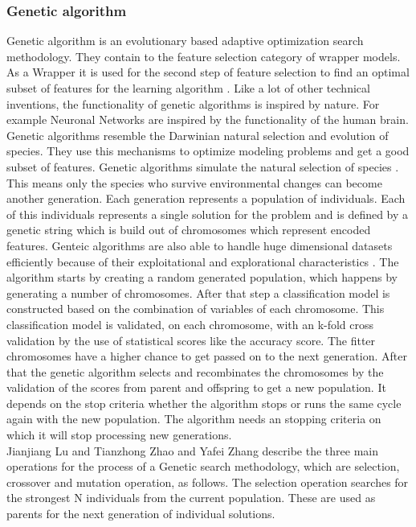 \documentclass[../masterarbeit.tex]{subfiles}
\begin{document}
\subsubsection{Genetic algorithm}
Genetic algorithm is an evolutionary based adaptive optimization search methodology. They contain to the feature selection category of wrapper models. As a Wrapper it is used for the second step of feature selection to find an optimal subset of features for the learning algorithm \textcite[]{CAI201870}. Like a lot of other technical inventions, the functionality of genetic algorithms is inspired by nature. For example Neuronal Networks are inspired by the functionality of the human brain. Genetic algorithms resemble the Darwinian natural selection and evolution of species. They use this mechanisms to optimize modeling problems and get a good subset of features. Genetic algorithms simulate the natural selection of species \textcite[]{LU2008887} . This means only the species who survive environmental changes can become another generation. Each generation represents a population of individuals. Each of this individuals represents a single solution for the problem and is defined by a genetic string which is build out of chromosomes which represent encoded features. \autocite[]{LU2008887} \textcite[]{DBLP:1912}  Genteic algorithms are also able to handle huge dimensional datasets efficiently because of their exploitational and explorational characteristics \textcite[]{LU2008887}. The algorithm starts by creating a random generated population, which happens by generating a number of chromosomes. After that step a classification model is constructed based on the combination of variables of each chromosome. This classification model is validated, on each chromosome, with an k-fold cross validation by the use of statistical scores like the accuracy score. The fitter chromosomes have a higher chance to get passed on to the next generation. After that the genetic algorithm selects and recombinates the chromosomes by the validation of the scores from parent and offspring to get a new population. It depends on the stop criteria whether the algorithm stops or runs the same cycle again with the new population. The algorithm needs an stopping criteria on which it will stop processing new generations. \autocite[]{DBLP:1912} \textcite[]{Yang:2018} \textcite[]{LU2008887}\\
Jianjiang Lu and Tianzhong Zhao and Yafei Zhang \textcite[]{LU2008887} describe the three main operations for the process of a Genetic search methodology, which are selection, crossover and mutation operation, as follows. The selection operation searches for the strongest N individuals from the current population. These are used as parents for the next generation of individual solutions.
\end{document}
